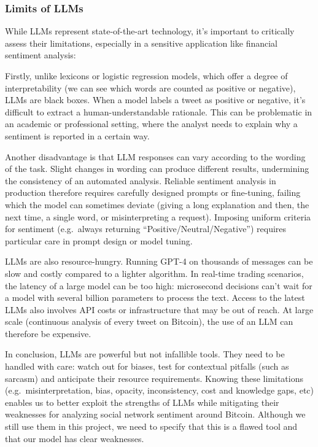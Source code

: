 \documentclass[
  a4paper]{article}
\begin{document}
\hypertarget{limits-of-llms}{%
\subsubsection{Limits of LLMs}\label{limits-of-llms}}

While LLMs represent state-of-the-art technology, it's important to
critically assess their limitations, especially in a sensitive
application like financial sentiment analysis:

Firstly, unlike lexicons or logistic regression models, which offer a
degree of interpretability (we can see which words are counted as
positive or negative), LLMs are black boxes. When a model labels a tweet
as positive or negative, it's difficult to extract a
human-understandable rationale. This can be problematic in an academic
or professional setting, where the analyst needs to explain why a
sentiment is reported in a certain way.

Another disadvantage is that LLM responses can vary according to the
wording of the task. Slight changes in wording can produce different
results, undermining the consistency of an automated analysis. Reliable
sentiment analysis in production therefore requires carefully designed
prompts or fine-tuning, failing which the model can sometimes deviate
(giving a long explanation and then, the next time, a single word, or
misinterpreting a request). Imposing uniform criteria for sentiment
(e.g.~always returning ``Positive/Neutral/Negative'') requires
particular care in prompt design or model tuning.

LLMs are also resource-hungry. Running GPT-4 on thousands of messages
can be slow and costly compared to a lighter algorithm. In real-time
trading scenarios, the latency of a large model can be too high:
microsecond decisions can't wait for a model with several billion
parameters to process the text. Access to the latest LLMs also involves
API costs or infrastructure that may be out of reach. At large scale
(continuous analysis of every tweet on Bitcoin), the use of an LLM can
therefore be expensive.

In conclusion, LLMs are powerful but not infallible tools. They need to
be handled with care: watch out for biases, test for contextual pitfalls
(such as sarcasm) and anticipate their resource requirements. Knowing
these limitations (e.g.~misinterpretation, bias, opacity, inconsistency,
cost and knowledge gaps, etc) enables us to better exploit the strengths
of LLMs while mitigating their weaknesses for analyzing social network
sentiment around Bitcoin. Although we still use them in this project, we
need to specify that this is a flawed tool and that our model has clear
weaknesses.
\end{document}
